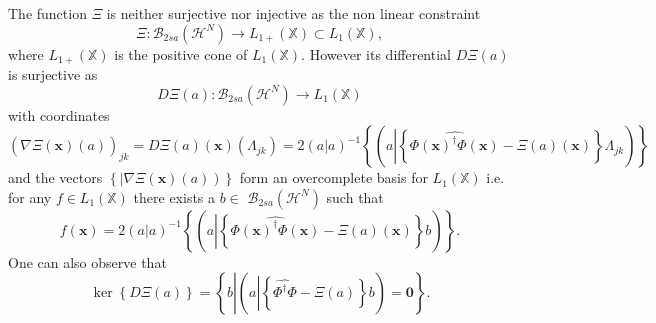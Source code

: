 \documentclass[aps,preprint]{revtex4}%
\begin{document}
The function $\Xi$ is neither surjective nor injective as the non linear
constraint
\begin{equation}
\Xi:\mathcal{B}_{2sa}\left(  \mathcal{H}^{N}\right)  \rightarrow L_{1+}\left(
\mathbb{X}\right)  \subset L_{1}\left(  \mathbb{X}\right)  ,
\end{equation}
where $L_{1+}\left(  \mathbb{X}\right)  $ is the positive cone of
$L_{1}\left(  \mathbb{X}\right)  .$ However its differential $D\Xi\left(
a\right)  $ is surjective as
\begin{equation}
D\Xi\left(  a\right)  :\mathcal{B}_{2sa}\left(  \mathcal{H}^{N}\right)
\rightarrow L_{1}\left(  \mathbb{X}\right)
\end{equation}
with coordinates%
\begin{equation}
\left(  \overset{}{\nabla\Xi\left(  \mathbf{x}\right)  \left(  a\right)
}\right)  _{jk}=D\Xi\left(  a\right)  \left(  \mathbf{x}\right)  \left(
\Lambda_{jk}\right)  =2\left(  \overset{}{a}\left\vert a\right.  \right)
^{-1}\left\{  \left(  a\left\vert \left\{  \widehat{\Phi\left(  \mathbf{x}%
\right)  ^{\dagger}\Phi\left(  \mathbf{x}\right)  }-\Xi\left(  a\right)
\left(  \mathbf{x}\right)  \right\}  \right.  \Lambda_{jk}\right)  \right\}
\end{equation}
and the vectors $\left\{  \left\vert \nabla\Xi\left(  \mathbf{x}\right)
\left(  a\right)  \right)  \right\}  $ form an overcomplete basis for
$L_{1}\left(  \mathbb{X}\right)  $ i.e. for any $f\in L_{1}\left(
\mathbb{X}\right)  $ there exists a $b\in$ $\mathcal{B}_{2sa}\left(
\mathcal{H}^{N}\right)  $ such that
\begin{equation}
f\left(  \mathbf{x}\right)  =2\left(  \overset{}{a}\left\vert a\right.
\right)  ^{-1}\left\{  \left(  a\left\vert \left\{  \widehat{\Phi\left(
\mathbf{x}\right)  ^{\dagger}\Phi\left(  \mathbf{x}\right)  }-\Xi\left(
a\right)  \left(  \mathbf{x}\right)  \right\}  \right.  b\right)  \right\}
\mathbf{.}%
\end{equation}
One can also observe that
\begin{equation}
\ker\left\{  D\Xi\left(  a\right)  \right\}  =\left\{  b\left\vert \left(
a\left\vert \left\{  \widehat{\Phi^{\dagger}\Phi}-\Xi\left(  a\right)
\right\}  \right.  b\right)  =\mathbf{0}\right.  \right\}  .
\end{equation}
\end{document}
